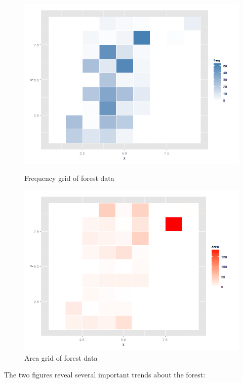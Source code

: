 \documentclass{article}
\begin{document}
\begin{figure}
  \begin{minipage}[b]{0.475\linewidth}
  \centering
  \includegraphics[width=\textwidth]{figures/freq.png}
  \caption{Frequency grid of forest data}
  \label{fig:fire_freq}
\end{minipage}
\hspace{0.5cm}
  \begin{minipage}[b]{0.475\linewidth}
  \centering
  \includegraphics[width=\textwidth]{figures/area.png}
  \caption{Area grid of forest data}
  \label{fig:fire_area}
\end{minipage}
\end{figure}

The two figures reveal several important trends about the forest:
\end{document}
